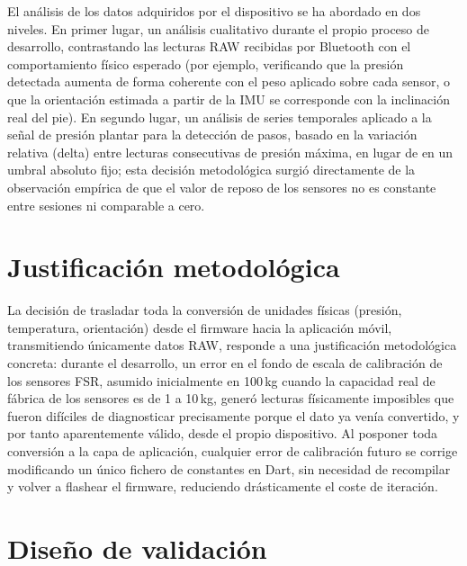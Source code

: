 \begin{IAtext}
El análisis de los datos adquiridos por el dispositivo se ha abordado en dos niveles. En primer lugar, un análisis cualitativo durante el propio proceso de desarrollo, contrastando las lecturas RAW recibidas por Bluetooth con el comportamiento físico esperado (por ejemplo, verificando que la presión detectada aumenta de forma coherente con el peso aplicado sobre cada sensor, o que la orientación estimada a partir de la IMU se corresponde con la inclinación real del pie). En segundo lugar, un análisis de series temporales aplicado a la señal de presión plantar para la detección de pasos, basado en la variación relativa (delta) entre lecturas consecutivas de presión máxima, en lugar de en un umbral absoluto fijo; esta decisión metodológica surgió directamente de la observación empírica de que el valor de reposo de los sensores no es constante entre sesiones ni comparable a cero.

\section{Justificación metodológica}

La decisión de trasladar toda la conversión de unidades físicas (presión, temperatura, orientación) desde el firmware hacia la aplicación móvil, transmitiendo únicamente datos RAW, responde a una justificación metodológica concreta: durante el desarrollo, un error en el fondo de escala de calibración de los sensores FSR, asumido inicialmente en 100\,kg cuando la capacidad real de fábrica de los sensores es de 1 a 10\,kg, generó lecturas físicamente imposibles que fueron difíciles de diagnosticar precisamente porque el dato ya venía convertido, y por tanto aparentemente válido, desde el propio dispositivo. Al posponer toda conversión a la capa de aplicación, cualquier error de calibración futuro se corrige modificando un único fichero de constantes en Dart, sin necesidad de recompilar y volver a flashear el firmware, reduciendo drásticamente el coste de iteración.

\section{Diseño de validación}


\end{IAtext}
